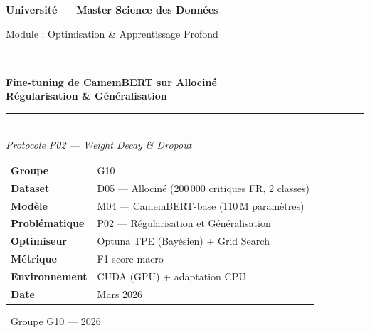 \documentclass[12pt,a4paper]{article}
\newcommand{\best}[1]{\textcolor{bestgreen}{\textbf{#1}}}
\begin{document}
\begin{titlepage}
  \centering
  \vspace*{1.5cm}
  {\Large\textbf{Université — Master Science des Données}\par}
  \vspace{0.4cm}
  {\large Module : Optimisation \& Apprentissage Profond\par}
  \vspace{2cm}

  \rule{\textwidth}{1.5pt}\\[0.6em]
  {\huge\bfseries\textcolor{camemblue}{%
    Fine-tuning de CamemBERT sur Allociné\\[0.3em]
    Régularisation \& Généralisation}\\[0.5em]}
  \rule{\textwidth}{1.5pt}\\[1.5em]

  {\large\textit{Protocole P02 — Weight Decay \& Dropout}}\par
  \vspace{1cm}

  \begin{tabular}{ll}
    \toprule
    \textbf{Groupe}        & G10 \\
    \textbf{Dataset}       & D05 — Allociné (200\,000 critiques FR, 2 classes) \\
    \textbf{Modèle}        & M04 — CamemBERT-base (110\,M paramètres) \\
    \textbf{Problématique} & P02 — Régularisation et Généralisation \\
    \textbf{Optimiseur}    & Optuna TPE (Bayésien) + Grid Search \\
    \textbf{Métrique}      & F1-score macro \\
    \textbf{Environnement} & CUDA (GPU) + adaptation CPU \\
    \textbf{Date}          & Mars 2026 \\
    \bottomrule
  \end{tabular}

  \vspace{2cm}
  \begin{abstract}
    Ce rapport présente le fine-tuning de \textbf{CamemBERT-base} (110\,M paramètres)
    pour l'analyse de sentiment sur le dataset Allociné (D05), en se concentrant sur
    la \textbf{problématique P02} : comment le \texttt{weight\_decay} et le \texttt{dropout}
    influencent-ils la généralisation du modèle~? Nous mettons en œuvre un protocole
    en trois phases~: grid search exhaustif ($4 \times 3 = 12$ combinaisons),
    optimisation bayésienne Optuna/TPE (20 trials), et analyse du paysage de perte.
    Le modèle optimisé atteint \best{F1 = 0,9600} sur le jeu de test, soit un gain
    de +2,5\% sur la baseline. L'analyse révèle que le dropout~=~0,1 est le régulateur
    optimal pour les transformers de cette taille, tandis que le weight decay joue
    un rôle secondaire dans ce régime de fine-tuning.
  \end{abstract}

  \vfill
  {\small \textcopyright\ Groupe G10 — 2026}
\end{titlepage}
\end{document}
